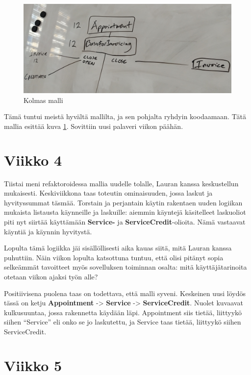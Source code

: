 \begin{figure}
\centering
\includegraphics[width=\textwidth,height=0.5\textheight]{illustration/malli3.jpg}
\caption{\label{diarymalli3}Kolmas malli}
\end{figure}

Tämä tuntui meistä hyvältä mallilta, ja sen pohjalta ryhdyin koodaamaan.
Tätä mallia esittää kuva \ref{diarymalli3}. Sovittiin uusi palaveri
viikon päähän.

\hypertarget{viikko-4}{%
\section{Viikko 4}\label{viikko-4}}

Tiistai meni refaktoroidessa mallia uudelle tolalle, Lauran kanssa
keskustellun mukaisesti. Keskiviikkona taas toteutin ominaisuuden, jossa
laskut ja hyvityssummat täsmää. Torstain ja perjantain käytin rakentaen
uuden logiikan mukaista listausta käynneille ja laskuille: aiemmin
käyntejä käsitelleet laskuoliot piti nyt siirtää käyttämään
\textbf{Service-} ja \textbf{ServiceCredit}-olioita. Nämä vastaavat
käyntiä ja käynnin hyvitystä.

Lopulta tämä logiikka jäi sisällöllisesti aika kauas siitä, mitä Lauran
kanssa puhuttiin. Näin viikon lopulta katsottuna tuntuu, että olisi
pitänyt sopia selkeämmät tavoitteet myös sovelluksen toiminnan osalta:
mitä käyttäjätarinoita otetaan viikon ajaksi työn alle?

Positiivisena puolena taas on todettava, että malli syveni. Keskeinen
uusi löydös tässä on ketju \textbf{Appointment} -\textgreater{}
\textbf{Service} -\textgreater{} \textbf{ServiceCredit}. Nuolet kuvaavat
kulkusuuntaa, jossa rakennetta käydään läpi. Appointment siis tietää,
liittyykö siihen ``Service'' eli onko se jo laskutettu, ja Service taas
tietää, liittyykö siihen ServiceCredit.

\hypertarget{viikko-5}{%
\section{Viikko 5}\label{viikko-5}}

